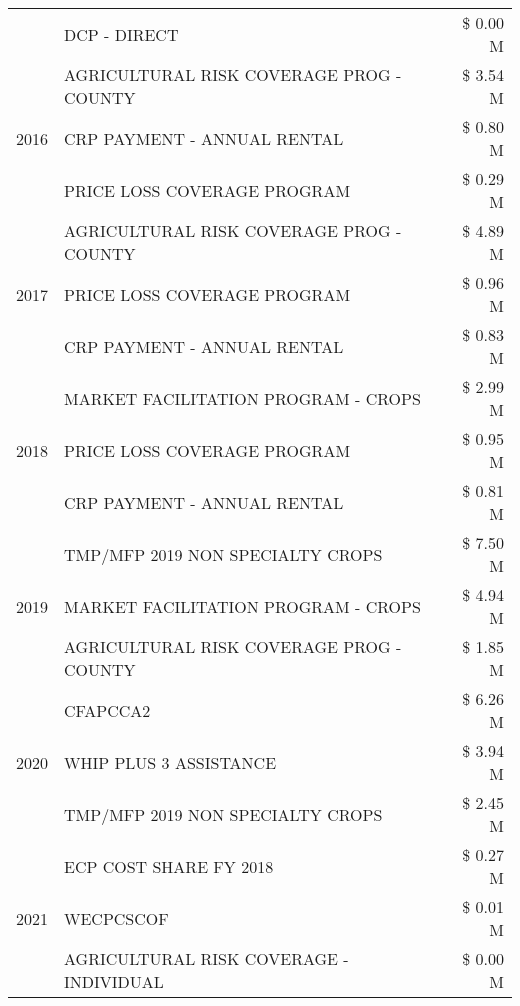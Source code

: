 \begin{tabular}{llr}
 & DCP - DIRECT & \$ 0.00 M \\
\cline{1-3}
\multirow[t]{3}{*}{2016} & AGRICULTURAL RISK COVERAGE PROG - COUNTY & \$ 3.54 M \\
 & CRP PAYMENT - ANNUAL RENTAL & \$ 0.80 M \\
 & PRICE LOSS COVERAGE PROGRAM & \$ 0.29 M \\
\cline{1-3}
\multirow[t]{3}{*}{2017} & AGRICULTURAL RISK COVERAGE PROG - COUNTY & \$ 4.89 M \\
 & PRICE LOSS COVERAGE PROGRAM & \$ 0.96 M \\
 & CRP PAYMENT - ANNUAL RENTAL & \$ 0.83 M \\
\cline{1-3}
\multirow[t]{3}{*}{2018} & MARKET FACILITATION PROGRAM - CROPS & \$ 2.99 M \\
 & PRICE LOSS COVERAGE PROGRAM & \$ 0.95 M \\
 & CRP PAYMENT - ANNUAL RENTAL & \$ 0.81 M \\
\cline{1-3}
\multirow[t]{3}{*}{2019} & TMP/MFP 2019 NON SPECIALTY CROPS & \$ 7.50 M \\
 & MARKET FACILITATION PROGRAM - CROPS & \$ 4.94 M \\
 & AGRICULTURAL RISK COVERAGE PROG - COUNTY & \$ 1.85 M \\
\cline{1-3}
\multirow[t]{3}{*}{2020} & CFAPCCA2 & \$ 6.26 M \\
 & WHIP PLUS 3 ASSISTANCE & \$ 3.94 M \\
 & TMP/MFP 2019 NON SPECIALTY CROPS & \$ 2.45 M \\
\cline{1-3}
\multirow[t]{3}{*}{2021} & ECP COST SHARE FY 2018 & \$ 0.27 M \\
 & WECPCSCOF & \$ 0.01 M \\
 & AGRICULTURAL RISK COVERAGE - INDIVIDUAL & \$ 0.00 M \\
\cline{1-3}
\bottomrule
\end{tabular}
